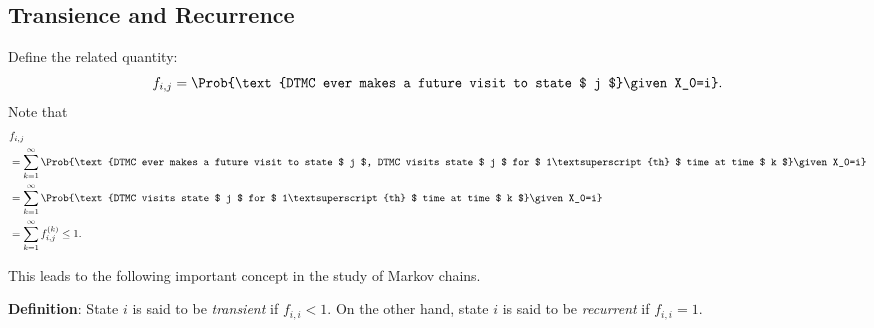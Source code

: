 \subsection*{Transience and Recurrence}
\begin{Regular}
    Define the related quantity:
    \[ f_{i,j}=\Prob{\text{DTMC ever makes a future visit to state $ j $}\given X_0=i}. \]
    Note that
    \begin{align*}
         & f_{i,j}                                                                                                                                                                \\
         & =\sum_{k=1}^{\infty} \Prob{\text{DTMC ever makes a future visit to state $ j $, DTMC visits state $ j $ for $ 1\textsuperscript{th} $ time at time $ k $}\given X_0=i} \\
         & =\sum_{k=1}^{\infty} \Prob{\text{DTMC visits state $ j $ for $ 1\textsuperscript{th} $ time at time $ k $}\given X_0=i}                                                \\
         & =\sum_{k=1}^{\infty} f_{i,j}^{(k)}\le 1.
    \end{align*}
\end{Regular}
This leads to the following important concept in the study of Markov chains.
\begin{Regular}
    \textbf{Definition}: State $ i $ is said to be \emph{transient} if $ f_{i,i}<1 $. On the other hand, state $ i $ is said to be
    \emph{recurrent} if $ f_{i,i}=1 $.
\end{Regular}
